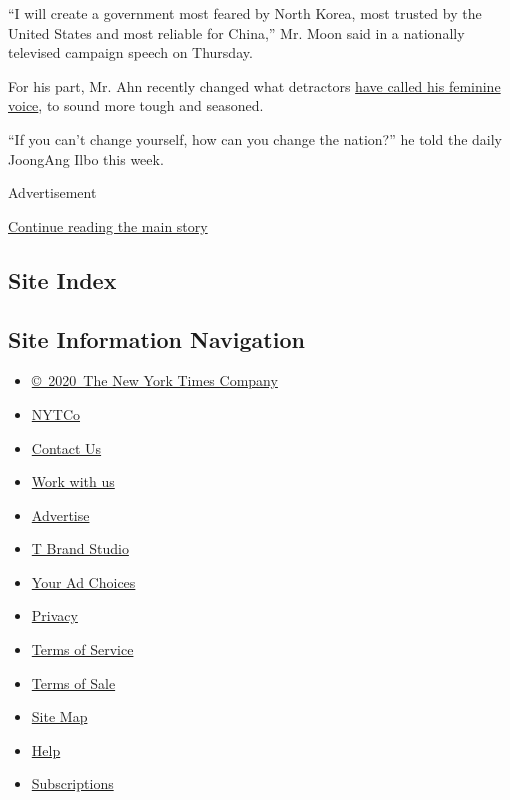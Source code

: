 ``I will create a government most feared by North Korea, most trusted by
the United States and most reliable for China,'' Mr. Moon said in a
nationally televised campaign speech on Thursday.

For his part, Mr. Ahn recently changed what detractors
\href{http://tv.naver.com/v/1551851}{have called his feminine voice}, to
sound more tough and seasoned.

``If you can't change yourself, how can you change the nation?'' he told
the daily JoongAng Ilbo this week.

Advertisement

\protect\hyperlink{after-bottom}{Continue reading the main story}

\hypertarget{site-index}{%
\subsection{Site Index}\label{site-index}}

\hypertarget{site-information-navigation}{%
\subsection{Site Information
Navigation}\label{site-information-navigation}}

\begin{itemize}
\tightlist
\item
  \href{https://help.nytimes.com/hc/en-us/articles/115014792127-Copyright-notice}{©~2020~The
  New York Times Company}
\end{itemize}

\begin{itemize}
\tightlist
\item
  \href{https://www.nytco.com/}{NYTCo}
\item
  \href{https://help.nytimes.com/hc/en-us/articles/115015385887-Contact-Us}{Contact
  Us}
\item
  \href{https://www.nytco.com/careers/}{Work with us}
\item
  \href{https://nytmediakit.com/}{Advertise}
\item
  \href{http://www.tbrandstudio.com/}{T Brand Studio}
\item
  \href{https://www.nytimes.com/privacy/cookie-policy\#how-do-i-manage-trackers}{Your
  Ad Choices}
\item
  \href{https://www.nytimes.com/privacy}{Privacy}
\item
  \href{https://help.nytimes.com/hc/en-us/articles/115014893428-Terms-of-service}{Terms
  of Service}
\item
  \href{https://help.nytimes.com/hc/en-us/articles/115014893968-Terms-of-sale}{Terms
  of Sale}
\item
  \href{https://spiderbites.nytimes.com}{Site Map}
\item
  \href{https://help.nytimes.com/hc/en-us}{Help}
\item
  \href{https://www.nytimes.com/subscription?campaignId=37WXW}{Subscriptions}
\end{itemize}
